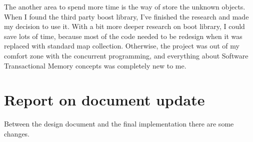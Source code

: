 \documentclass[12pt]{article}
\begin{document}
The another area to spend more time is the way of store the unknown objects. When I found the third party boost library, I've finished the research and made my decision to use it. With a bit more deeper research on boot library, I could save lots of time, because most of the code needed to be redesign when it was replaced with standard map collection. Otherwise, the project was out of my comfort zone with the concurrent programming, and everything about Software Transactional Memory concepts was completely new to me.\\

\section{Report on document update}
Between the design document and the final implementation there are some changes.
\end{document}
